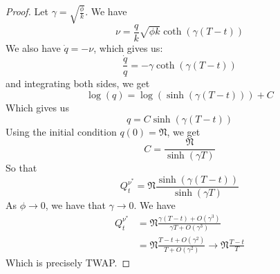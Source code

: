 \documentclass{amsart}
\begin{document}
\begin{proof}
    Let $\gamma = \sqrt{\frac{\phi}{k}}$.
    We have 
    \[
    \nu = \frac{q}{k}\sqrt{\phi k} \coth(\gamma (T - t))
    \]
    We also have $\dot{q} = - \nu$, which gives us: 
    \[
    \frac{\dot{q}}{q} = - \gamma \coth(\gamma (T - t)) 
    \]
    and integrating both sides, we get 
    \[
    \log(q) = \log(\sinh(\gamma(T - t))) + C
    \]
    Which gives us 
    \[
    q = C \sinh(\gamma(T - t))
    \]
    Using the initial condition $q(0) = \mathfrak{N}$, we get 
    \[
    C = \frac{\mathfrak{N}}{\sinh(\gamma T)}
    \]
    So that 
    \[
    Q_t^{\nu^\ast} = \mathfrak{N} \frac{\sinh(\gamma(T - t))}{\sinh(\gamma T)}
    \]
    As $\phi \to 0$, we have that $\gamma \to 0$. We have 
    \begin{align*}
    Q_t^{\nu^\ast} &= \mathfrak{N} \frac{\gamma(T - t) + O(\gamma^3)}{\gamma T + O(\gamma ^3)} \\
    &= \mathfrak{N}\frac{T - t + O(\gamma^2)}{T + O(\gamma^2)} \to \mathfrak{N}\frac{T - t}{T}
    \end{align*}
    Which is precisely TWAP.
\end{proof}
\end{document}
